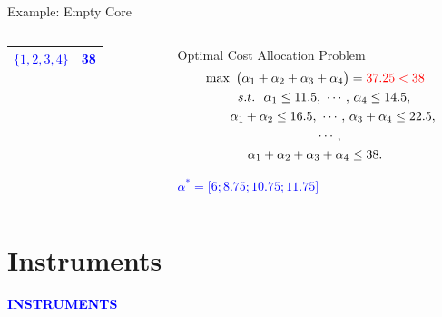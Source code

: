 \documentclass[14pt]{beamer}
\begin{document}
\begin{frame}{Example: Empty Core}
\begin{columns}
\begin{column}{4.5cm}
\begin{table}[H]
\begin{tabular}[!h]{c c }
\textcolor{blue}{$\{1,2,3,4\}$}	&\textcolor{blue}{38}	\\
\hline
\end{tabular}
\end{table}
\end{column}
\pause
\begin{column}{6.5cm}
\footnotesize
\vspace{-1em}
\begin{shaded}
\centering
Optimal Cost Allocation Problem
\begin{eqnarray*}
\begin{aligned}
\max ~\big(\alpha_1 + \alpha_2 + \alpha_3 + \alpha_4\big) &= \textcolor{red}{37.25 < 38}\\
s.t.~~ \alpha_1 \leq 11.5,~\cdots,&~\alpha_4 \leq 14.5,\\
\alpha_1 + \alpha_2 \leq 16.5,~\cdots,~ &\alpha_3+\alpha_4 \leq 22.5,\\
~~~~~~~~~~\cdots,~~&\\
\alpha_1 + \alpha_2 + \alpha_3 + \alpha_4 &\leq 38.
\end{aligned}
\end{eqnarray*}
\vspace{-0.5em}
\end{shaded}
\begin{shaded}
\centering
\textcolor{blue}{
$\alpha^* = \big[6;8.75;10.75;11.75\big]$}
\end{shaded}
\end{column}
\end{columns}
\end{frame}



\section{Instruments}
\begin{frame}
\centering
\large
\textcolor{blue}{\bf {\huge I}NSTRUMENTS}
\end{frame}
\end{document}
